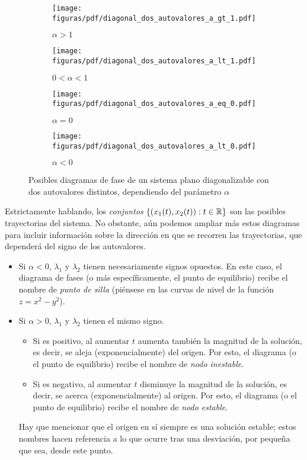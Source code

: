 \documentclass[../ecuaciones_diferenciales.tex]{subfiles}
\begin{document}
\begin{figure}[ht]
	\centering
	\begin{subfigure}{0.25\textwidth}
		\centering
		\texttt{[image: figuras/pdf/diagonal\_dos\_autovalores\_a\_gt\_1.pdf]}
		\caption*{\(\alpha > 1\)}
	\end{subfigure}%
	\begin{subfigure}{0.25\textwidth}
		\centering
		\texttt{[image: figuras/pdf/diagonal\_dos\_autovalores\_a\_lt\_1.pdf]}
		\caption*{\(0 < \alpha < 1\)}
	\end{subfigure}%
	\begin{subfigure}{0.25\textwidth}
		\centering
		\texttt{[image: figuras/pdf/diagonal\_dos\_autovalores\_a\_eq\_0.pdf]}
		\caption*{\(\alpha = 0\)}
	\end{subfigure}%
	\begin{subfigure}{0.25\textwidth}
		\centering
		\texttt{[image: figuras/pdf/diagonal\_dos\_autovalores\_a\_lt\_0.pdf]}
		\caption*{\(\alpha < 0\)}
	\end{subfigure}
	\caption{Posibles diagramas de fase de un sistema plano diagonalizable con 
	dos autovalores distintos, dependiendo del parámetro \(\alpha\)}%
	\label{fig:dos_autovalores}
\end{figure}

Estrictamente hablando, los \emph{conjuntos} \(\{(x_1(t),x_2(t)) : t \in \mathbb{R}\}\) son las posibles trayectorias del sistema.
No obstante, aún podemos ampliar más estos diagramas para incluir información sobre la dirección
en que se recorren las trayectorias, que dependerá del signo de los autovalores.

\begin{itemize}
	\item Si \(\alpha < 0\), \(\lambda_1\) y \(\lambda_2\) tienen necesariamente
	      signos opuestos. En este caso, el diagrama de fases (o más específicamente, el
	      punto de equilibrio) recibe el nombre de \emph{punto de silla} (piénsese en
		  las curvas de nivel de la función  
		  \(z = x^2 - y^2\)).

	\item Si \(\alpha > 0\), \(\lambda_1\) y \(\lambda_2\) tienen el mismo signo.
	      \begin{itemize}
		      \item Si es positivo, al aumentar \(t\) aumenta también la magnitud de la
		            solución, es decir, se aleja (exponencialmente) del origen. Por esto, el
		            diagrama (o el punto de equilibrio) recibe el nombre de \emph{nodo
			            inestable}.
		      \item Si es negativo, al aumentar \(t\) disminuye la magnitud de la solución,
		            es decir, se acerca (exponencialmente) al origen. Por esto, el diagrama (o
		            el punto de equilibrio) recibe el nombre de \emph{nodo estable}.
	      \end{itemize}
	      Hay que mencionar que el origen en sí siempre es una solución estable; estos
	      nombres hacen referencia a lo que ocurre tras una desviación, por pequeña que
	      sea, desde este punto.
\end{itemize}
\end{document}
